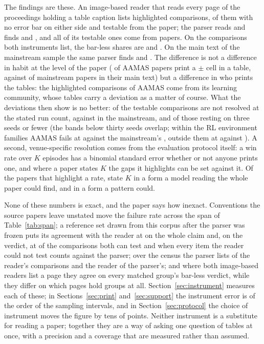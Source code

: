 \documentclass[sigconf,anonymous]{aamas}
\begin{document}
The findings are these. An image-based reader that reads every page of the
proceedings holding a table caption lists \nCzGroups{} highlighted
comparisons, \nCzNeither{} of them with no error bar on either side and
\nCzTestable{} testable from the paper; the parser reads \nAComparisons{}
and finds \nAPctNeither{} and \nAPctTestable{}, and all of its testable
ones come from \nAPapersTestable{} papers. On the \nCzPipeMatchedGroups{}
comparisons both instruments list, the bar-less shares are
\nCzMatchedNeither{} and \nCzPipeMatchedNeither{}. On the main text of the mainstream sample
the same parser finds \nMlMainNeither{} and \nMlMainTestable{}. The
difference is not a difference in habit at the level of the paper
(\nAPctPapersErr{} of AAMAS papers print a $\pm$ cell in a table, against
\nMlMainPapersErr{} of mainstream papers in their main text) but a
difference in who prints the tables: the highlighted comparisons of AAMAS
come from its learning community, whose tables carry a deviation as a matter
of course. What the deviations then show is no better: \nAPctFail{} of the
testable comparisons are not resolved at the stated run count,
against \nMlMainFail{} in the mainstream, and \nRunsLeThreeFail{} of those
resting on three seeds or fewer (the bands below thirty seeds overlap;
within the RL environment families AAMAS fails at \nFmAamasRlFail{}
against the mainstream's \nFmMlRlFail{}, outside them at
\nFmAamasRestFail{} against \nFmMlRestFail{}). A second, venue-specific resolution comes
from the evaluation protocol itself: a win rate over $K$ episodes has a
binomial standard error whether or not anyone prints one, and where a paper
states $K$ the gaps it highlights can be set against it. Of the
\nPtwoRatePapers{} papers that highlight a rate, \nPtwoRatePapersWithK{}
state $K$ in a form a model reading the whole paper could find, and
\nPtwoRatePapersRegexK{} in a form a pattern could.

None of these numbers is exact, and the paper says how inexact. Conventions
the source papers leave unstated move the failure rate across the span of
Table~\ref{tab:span}; a reference set drawn from this corpus after the
parser was frozen puts its agreement with the reader at \nGClaim{} on the
whole claim and, on the verdict, at \nGVerdictFrac{} of the comparisons
both can test and \nGVerdictFullFrac{} when every item the reader could
not test counts against the parser; over the census the parser lists
\nCzReaderFoundPct{} of the reader's comparisons and the reader
\nCzPipeFoundPct{} of the parser's; and where both image-based readers
list a page they agree on every matched group's bar-less verdict, while
they differ on which pages hold groups at all.
Section~\ref{sec:instrument} measures each of these; in
Sections~\ref{sec:print} and~\ref{sec:support} the instrument error is of
the order of the sampling intervals, and in Section~\ref{sec:protocol} the
choice of instrument moves the figure by tens of points. Neither instrument
is a substitute for reading a paper; together they are a way of asking one
question of \nCzTables{} tables at once, with a precision and a coverage
that are measured rather than assumed.
\end{document}
